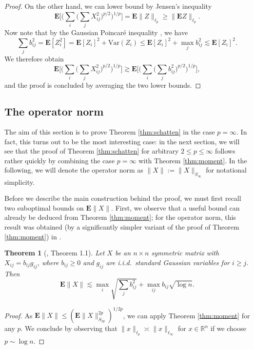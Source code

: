 \documentclass[10pt,reqno]{amsart}
\newtheorem{thm}{Theorem}[section]
\theoremstyle{definition}
\numberwithin{equation}{section}
\numberwithin{figure}{section}
\numberwithin{table}{section}
\begin{document}
\begin{proof}
On the other hand, we can lower bound by Jensen's inequality
$$
	\mathbf{E}\Bigg[ 
        \Bigg(\sum_i\Bigg(\sum_j X_{ij}^2\Bigg)^{p/2}\Bigg)^{1/p}
        \Bigg] =
	\mathbf{E}\|Z\|_{\ell_p}
	\ge
	\|\mathbf{E}Z\|_{\ell_p}.
$$
Now note that by the Gaussian Poincar\'e inequality \cite[Theorem 
3.20]{BLM13}, we have
$$
	\sum_j b_{ij}^2 = \mathbf{E}[Z_i^2] =
	\mathbf{E}[Z_i]^2 + \mathrm{Var}(Z_i) \le
	\mathbf{E}[Z_i]^2  +\max_{j}b_{ij}^2 \lesssim
	\mathbf{E}[Z_i]^2.
$$
We therefore obtain
$$
	\mathbf{E}\Bigg[ 
        \Bigg(\sum_i\Bigg(\sum_j X_{ij}^2\Bigg)^{p/2}\Bigg)^{1/p}
        \Bigg] 
	\gtrsim
	\mathbf{E}\Bigg[ 
        \Bigg(\sum_i\Bigg(\sum_j b_{ij}^2\Bigg)^{p/2}\Bigg)^{1/p}
        \Bigg],
$$
and the proof is concluded by averaging the two lower bounds.
\end{proof}


\subsection{The operator norm}
\label{sec:opnorm}

The aim of this section is to prove Theorem \ref{thm:schatten} in the case 
$p=\infty$. In fact, this turns out to be the most interesting case: in 
the next section, we will see that the proof of Theorem \ref{thm:schatten} 
for arbitrary $2\le p\le\infty$ follows rather quickly by combining the 
case $p=\infty$ with Theorem \ref{thm:moment}. In the following, we will 
denote the operator norm as $\|X\|:=\|X\|_{S_\infty}$ for notational 
simplicity.

Before we describe the main construction behind the proof, we must first 
recall two suboptimal bounds on $\mathbf{E}\|X\|$. First, we observe that 
a useful bound can already be deduced from Theorem \ref{thm:moment}; for 
the operator norm, this result was obtained (by a significantly simpler 
variant of the proof of Theorem \ref{thm:moment}) in \cite{BvH16}.

\begin{thm}[\cite{BvH16}, Theorem 1.1]
\label{thm:bvh}
Let $X$ be an $n\times n$ symmetric matrix with 
$X_{ij}=b_{ij}g_{ij}$, where $b_{ij}\ge 0$ and $g_{ij}$ are i.i.d.\ 
standard Gaussian variables for $i\ge j$. Then
$$
	\mathbf{E}\|X\|\lesssim
	\max_i\sqrt{\sum_j b_{ij}^2} + 
	\max_{ij}b_{ij}\sqrt{\log n}.
$$
\end{thm}

\begin{proof}
As $\mathbf{E}\|X\|\le(\mathbf{E}\|X\|_{S_{2p}}^{2p})^{1/2p}$,
we can apply Theorem \ref{thm:moment} for any $p$. We conclude by 
observing that $\|x\|_{\ell_p}\asymp \|x\|_{\ell_\infty}$ for 
$x\in\mathbb{R}^n$ if we choose $p\sim\log n$.
\end{proof}
\end{document}
